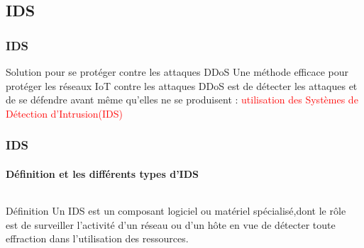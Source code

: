 \documentclass[aspectratio=169,professionalfonts, 12pt]{beamer}
\begin{document}

\subsection{IDS}
\begin{frame}
  \frametitle{IDS}
  \begin{block}{Solution pour se protéger contre les attaques DDoS}
  \justifying
  Une méthode efficace pour protéger les réseaux IoT contre les attaques DDoS est de détecter les attaques et de se défendre avant même qu’elles ne se produisent : \pause \textcolor{red}{utilisation des Systèmes de Détection d'Intrusion(IDS)}
  \end{block}
\end{frame}

\begin{frame}
  \frametitle{IDS}
  \framesubtitle{Définition et les différents types d'IDS}
\begin{columns}
	\begin{column}{0.5\textwidth}
			\begin{block}{Définition}
\justifying  
Un IDS est un composant logiciel ou matériel spécialisé,dont le rôle est de surveiller l’activité d’un réseau ou d’un hôte en vue de détecter toute effraction
dans l’utilisation des ressources.
 	 		\end{block}
	 \end{column}
    \begin{column}{0.5\textwidth}
   \end{column}
\end{columns}  
\end{frame}
\end{document}
